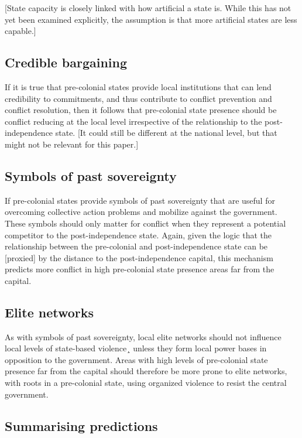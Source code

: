 \documentclass[12pt]{article}
\begin{document}
[State capacity is closely linked with how artificial a state is. While this has
not yet been examined explicitly, the assumption is that more artificial states
are less capable.]

\subsection{Credible bargaining} \label{Credible bargaining}

If it is true that pre-colonial states provide local institutions that can lend
credibility to commitments, and thus contribute to conflict prevention and
conflict resolution, then it follows that pre-colonial state presence should be
conflict reducing at the local level irrespective of the relationship to the
post-independence state. [It could still be different at the national level, but
that might not be relevant for this paper.]

\subsection{Symbols of past sovereignty} \label{Symbols of sovereignty}

If pre-colonial states provide symbols of past sovereignty that are useful for
overcoming collective action problems and mobilize against the government. These
symbols should only matter for conflict when they represent a potential
competitor to the post-independence state. Again, given the logic that the
relationship between the pre-colonial and post-independence state can be
[proxied] by the distance to the post-independence capital, this mechanism
predicts more conflict in high pre-colonial state presence areas far from the
capital.

\subsection{Elite networks} \label{Elite networks}

As with symbols of past sovereignty, local elite networks should not influence
local levels of state-based violence¸ unless they form local power bases in
opposition to the government. Areas with high levels of pre-colonial state
presence far from the capital should therefore be more prone to elite networks,
with roots in a pre-colonial state, using organized violence to resist the
central government.

\subsection{Summarising predictions} \label{Summarising predictions}
\end{document}
